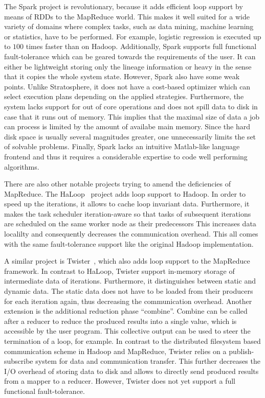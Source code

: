 The Spark project is revolutionary, because it adds efficient loop support by means of RDDs to the MapReduce world.
This makes it well suited for a wide variety of domains where complex tasks, such as data mining, machine learning or statistics, have to be performed.
For example, logistic regression is executed up to $100$ times faster than on Hadoop.
Additionally, Spark supports full functional fault-tolerance which can be geared towards the requirements of the user.
It can either be lightweight storing only the lineage information or heavy in the sense that it copies the whole system state.
However, Spark also have some weak points.
Unlike Stratosphere, it does not have a cost-based optimizer which can select execution plans depending on the applied strategies.
Furthermore, the system lacks support for out of core operations and does not spill data to disk in case that it runs out of memory.
This implies that the maximal size of data a job can process is limited by the amount of availabe main memory.
Since the hard disk space is usually several magnitudes greater, one unnecessarily limits the set of solvable problems.
Finally, Spark lacks an intuitive Matlab-like language frontend and thus it requires a considerable expertise to code well performing algorithms.

There are also other notable projects trying to amend the deficiencies of MapReduce.
The HaLoop~\cite{bu:pve2010a} project adds loop support to Hadoop.
In order to speed up the iterations, it allows to cache loop invariant data.
Furthermore, it makes the task scheduler iteration-aware so that tasks of subsequent iterations are scheduled on the same worker node as their predecessors
This increases data localilty and consequently decreases the communication overhead.
This all comes with the same fault-tolerance support like the original Hadoop implementation.

A similar project is Twister~\cite{ekanayake:2010a}, which also adds loop support to the MapReduce framework.
In contrast to HaLoop, Twister support in-memory storage of intermediate data of iterations.
Furthermore, it distinguishes between static and dynamic data.
The static data does not have to be loaded from their producers for each iteration again, thus decreasing the communication overhead.
Another extension is the additional reduction phase ``combine''.
Combine can be called after a reducer to reduce the produced results into a single value, which is accessible by the user program.
This collective output can be used to steer the termination of a loop, for example.
In contrast to the distributed filesystem based communication scheme in Hadoop and MapReduce, Twister relies on a publish-subscribe system for data and communication transfer.
This further decreases the I/O overhead of storing data to disk and allows to directly send produced results from a mapper to a reducer.
However, Twister does not yet support a full functional fault-tolerance.

